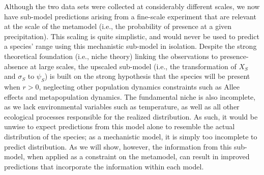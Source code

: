 \documentclass[11pt]{article}
\begin{document}
Although the two data sets were collected at considerably different scales, we now have sub-model predictions arising from a fine-scale experiment that are relevant at the scale of the metamodel (i.e., the probability of presence at a given precipitation). 
This scaling is quite simplistic, and would never be used to predict a species' range using this mechanistic sub-model in isolation.
Despite the strong theoretical foundation (i.e., niche theory) linking the observations to presence-absence at large scales, the upscaled sub-model (i.e., the transformation of \(X_S\) and \(\sigma_S\) to \(\psi_S\)) is built on the strong hypothesis that the species will be present when $r>0$, neglecting other population dynamics constraints such as Allee effects and metapopulation dynamics. 
The fundamental niche is also incomplete, as we lack environmental variables such as temperature, as well as all other ecological processes responsible for the realized distribution.
As such, it would be unwise to expect predictions from this model alone to resemble the actual distribution of the species; as a mechanistic model, it is simply too incomplete to predict distribution.
As we will show, however, the information from this sub-model, when applied as a constraint on the metamodel, can result in improved predictions that incorporate the information within each model.
\end{document}
